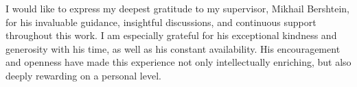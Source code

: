 I would like to express my deepest gratitude to my supervisor, Mikhail Bershtein, for his invaluable guidance, insightful discussions, and continuous support throughout this work. I am especially grateful for his exceptional kindness and generosity with his time, as well as his constant availability. His encouragement and openness have made this experience not only intellectually enriching, but also deeply rewarding on a personal level.